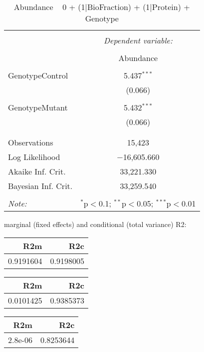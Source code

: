 \documentclass[11pt]{report}
\begin{document}
\begin{table}[!htbp] \centering 
  \caption{Abundance ~ 0 + (1|BioFraction) + (1|Protein) + Genotype} 
  \label{} 
\begin{tabular}{@{\extracolsep{5pt}}lc} 
\\[-1.8ex]\hline 
\hline \\[-1.8ex] 
 & \multicolumn{1}{c}{\textit{Dependent variable:}} \\ 
\cline{2-2} 
\\[-1.8ex] & Abundance \\ 
\hline \\[-1.8ex] 
 GenotypeControl & 5.437$^{***}$ \\ 
  & (0.066) \\ 
  & \\ 
 GenotypeMutant & 5.432$^{***}$ \\ 
  & (0.066) \\ 
  & \\ 
\hline \\[-1.8ex] 
Observations & 15,423 \\ 
Log Likelihood & $-$16,605.660 \\ 
Akaike Inf. Crit. & 33,221.330 \\ 
Bayesian Inf. Crit. & 33,259.540 \\ 
\hline 
\hline \\[-1.8ex] 
\textit{Note:}  & \multicolumn{1}{r}{$^{*}$p$<$0.1; $^{**}$p$<$0.05; $^{***}$p$<$0.01} \\ 
\end{tabular} 
\end{table} 
marginal (fixed effects) and conditional (total variance) R2:

\begin{tabular}{r|r}
\hline
R2m & R2c\\
\hline
0.9191604 & 0.9198005\\
\hline
\end{tabular}

\begin{tabular}{r|r}
\hline
R2m & R2c\\
\hline
0.0101425 & 0.9385373\\
\hline
\end{tabular}

\begin{tabular}{r|r}
\hline
R2m & R2c\\
\hline
2.8e-06 & 0.8253644\\
\hline
\end{tabular}
\end{document}
